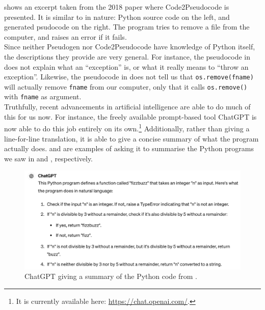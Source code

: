  shows an excerpt taken from the 2018 paper where Code2Pseudocode is presented. It is similar to  in nature: Python source code on the left, and generated psudocode on the right. The program tries to remove a file from the computer, and raises an error if it fails. \\

Since neither Pseudogen nor Code2Pseudocode have knowledge of Python itself, the descriptions they provide are very general. For instance, the pseudocode in  does not explain what an ``exception'' is, or what it really means to ``throw an exception''. Likewise, the pseudocode in  does not tell us that \texttt{os.remove(fname)} will actually remove \texttt{fname} from our computer, only that it calls \texttt{os.remove()} with \texttt{fname} as argument. \\

Truthfully, recent advancements in artificial intelligence are able to do much of this for us now. For instance, the freely available prompt-based tool ChatGPT is now able to do this job entirely on its own.\footnote{It is currently available here: \url{https://chat.openai.com/}.} Additionally, rather than giving a line-for-line translation, it is able to give a concise summary of what the program actually does.  and  are examples of asking it to summarise the Python programs we saw in  and , respectively. \\

\begin{figure}[ht]
    \centering
    \includegraphics[scale=.45]{assets/chapter3/gptFizzbuzz.png}
    \caption{ChatGPT giving a summary of the Python code from .}
    \label{gptfizz}
\end{figure}

